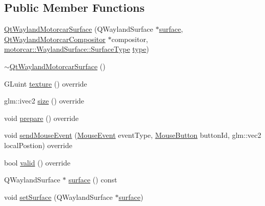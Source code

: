 \subsection*{Public Member Functions}
\begin{DoxyCompactItemize}
\item 
\hyperlink{classqtmotorcar_1_1QtWaylandMotorcarSurface_a054d4981e7da338c72e4fa6572869b60}{Qt\-Wayland\-Motorcar\-Surface} (Q\-Wayland\-Surface $\ast$\hyperlink{classqtmotorcar_1_1QtWaylandMotorcarSurface_aeac2b36246941755d0bedaf1c9fe773b}{surface}, \hyperlink{classqtmotorcar_1_1QtWaylandMotorcarCompositor}{Qt\-Wayland\-Motorcar\-Compositor} $\ast$compositor, \hyperlink{classmotorcar_1_1WaylandSurface_a7715a41b6776800656722407ec01e0a5}{motorcar\-::\-Wayland\-Surface\-::\-Surface\-Type} \hyperlink{classmotorcar_1_1WaylandSurface_a0e6e5e2455666f607a8ddb2479ba8e88}{type})
\item 
\hyperlink{classqtmotorcar_1_1QtWaylandMotorcarSurface_a0d9d57d75c14c209484174e47308f72f}{$\sim$\-Qt\-Wayland\-Motorcar\-Surface} ()
\item 
G\-Luint \hyperlink{classqtmotorcar_1_1QtWaylandMotorcarSurface_a573c52cdacb8f16c06ecd111bddabef6}{texture} () override
\item 
glm\-::ivec2 \hyperlink{classqtmotorcar_1_1QtWaylandMotorcarSurface_ad5e6f75c146a2952652deaf866ee22a7}{size} () override
\item 
void \hyperlink{classqtmotorcar_1_1QtWaylandMotorcarSurface_ae898706dcf80a2f00ed2477c570dcebe}{prepare} () override
\item 
void \hyperlink{classqtmotorcar_1_1QtWaylandMotorcarSurface_a25fff83e1cda809c210b1b73609396a2}{send\-Mouse\-Event} (\hyperlink{classmotorcar_1_1WaylandSurface_a062651eb16900ed15467b7ce6ccea390}{Mouse\-Event} event\-Type, \hyperlink{classmotorcar_1_1WaylandSurface_a263f154a6a2ac03d747ec61f667f7960}{Mouse\-Button} button\-Id, glm\-::vec2 local\-Postion) override
\item 
bool \hyperlink{classqtmotorcar_1_1QtWaylandMotorcarSurface_a3bea85a2a6a3079e60c3b37dd08aebc6}{valid} () override
\item 
Q\-Wayland\-Surface $\ast$ \hyperlink{classqtmotorcar_1_1QtWaylandMotorcarSurface_aeac2b36246941755d0bedaf1c9fe773b}{surface} () const 
\item 
void \hyperlink{classqtmotorcar_1_1QtWaylandMotorcarSurface_aa7921de176d4d39fe076f145dd382e75}{set\-Surface} (Q\-Wayland\-Surface $\ast$\hyperlink{classqtmotorcar_1_1QtWaylandMotorcarSurface_aeac2b36246941755d0bedaf1c9fe773b}{surface})
\end{DoxyCompactItemize}

